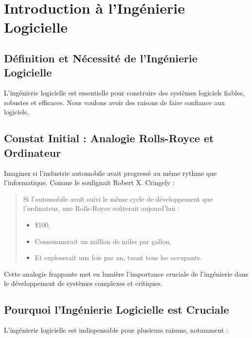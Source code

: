 \documentclass{article}
\begin{document}
\sloppy

\section{Introduction à l'Ingénierie Logicielle}

\subsection{Définition et Nécessité de l'Ingénierie Logicielle}

L'ingénierie logicielle est essentielle pour construire des systèmes logiciels fiables, robustes et efficaces.  Nous voulons avoir des raisons de faire confiance aux logiciels.

\subsection{Constat Initial : Analogie Rolls-Royce et Ordinateur}

Imaginez si l'industrie automobile avait progressé au même rythme que l'informatique.  Comme le soulignait Robert X. Cringely :

\begin{quote}
Si l'automobile avait suivi le même cycle de développement que l'ordinateur, une Rolls-Royce coûterait aujourd'hui :
\begin{itemize}
    \item \$100,
    \item Consommerait un million de miles par gallon,
    \item Et exploserait une fois par an, tuant tous les occupants.
\end{itemize}
\end{quote}

Cette analogie frappante met en lumière l'importance cruciale de l'ingénierie dans le développement de systèmes complexes et critiques.

\subsection{Pourquoi l'Ingénierie Logicielle est Cruciale}

L'ingénierie logicielle est indispensable pour plusieurs raisons, notamment :
\end{document}
